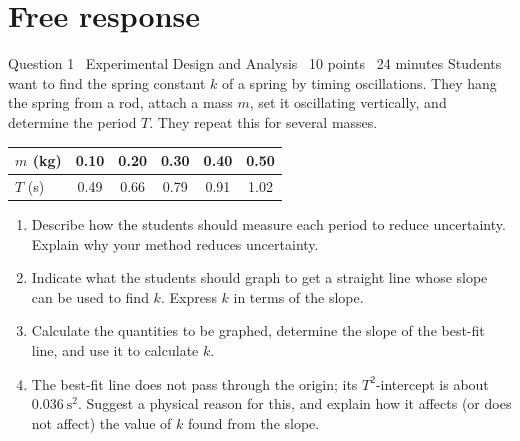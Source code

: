 \documentclass[11pt]{article}
\begin{document}
\section{Free response}

\begin{frq}{Question 1 \textperiodcentered\ Experimental Design and Analysis \textperiodcentered\ 10 points \textperiodcentered\ 24 minutes}
Students want to find the spring constant $k$ of a spring by timing oscillations. They hang the spring from a rod, attach a mass $m$, set it oscillating vertically, and determine the period $T$. They repeat this for several masses.

\medskip
\begin{tabular}{@{}lccccc@{}}\toprule
$m$ (kg) & 0.10 & 0.20 & 0.30 & 0.40 & 0.50 \\ \midrule
$T$ (s) & 0.49 & 0.66 & 0.79 & 0.91 & 1.02 \\ \bottomrule
\end{tabular}

\begin{enumerate}[label=(\alph*),leftmargin=2em,itemsep=4pt]
\item Describe how the students should measure each period to reduce uncertainty. Explain why your method reduces uncertainty. 
\item Indicate what the students should graph to get a straight line whose slope can be used to find $k$. Express $k$ in terms of the slope. 
\item Calculate the quantities to be graphed, determine the slope of the best-fit line, and use it to calculate $k$. 
\item The best-fit line does not pass through the origin; its $T^2$-intercept is about $0.036\ \mathrm{s^2}$. Suggest a physical reason for this, and explain how it affects (or does not affect) the value of $k$ found from the slope. 
\end{enumerate}
\end{frq}

\makekey
\end{document}
